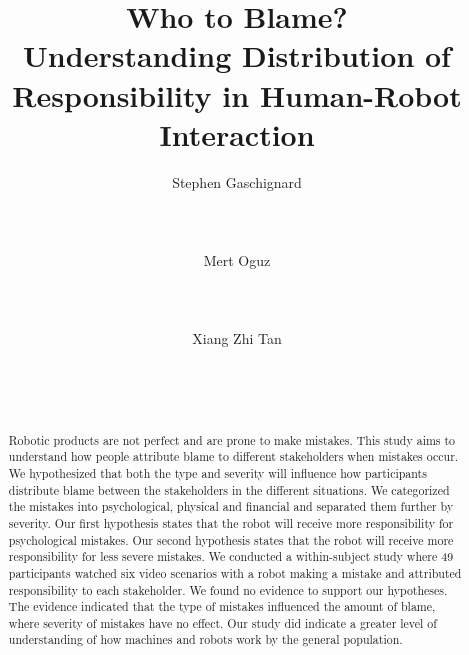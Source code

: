 \documentclass{sigchi}
\begin{document}
\title{Who to Blame?\\ Understanding Distribution of Responsibility in Human-Robot Interaction}

\author{
  \alignauthor  Stephen Gaschignard\\
    \\
    \\
    \\
  \alignauthor Mert Oguz\\
    \\
    \\
    \\    
  \alignauthor Xiang Zhi Tan\\
    \\
    \\
    \\
}

\maketitle

\begin{abstract}
Robotic products are not perfect and are prone to make mistakes. This study aims to understand how people attribute blame to different stakeholders when mistakes occur. We hypothesized that both the type and severity will influence how participants distribute blame between the stakeholders in the different situations. We categorized the mistakes into psychological, physical and financial and separated them further by severity. Our first hypothesis states that the robot will receive more responsibility for psychological mistakes. Our second hypothesis states that the robot will receive more responsibility for less severe mistakes. We conducted a within-subject study where 49 participants watched six video scenarios with a robot making a mistake and attributed responsibility to each stakeholder. We found no evidence to support our hypotheses. The evidence indicated that the type of mistakes influenced the amount of blame, where severity of mistakes have no effect. Our study did indicate a greater level of understanding of how machines and robots work by the general population.
\end{abstract}
\end{document}
